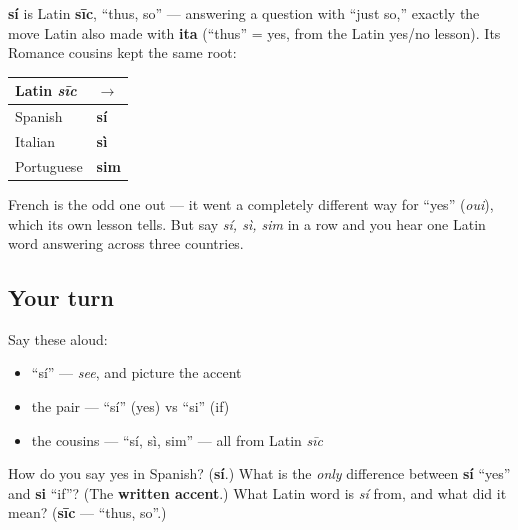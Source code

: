 \begin{cousinweb}
\textbf{sí} is Latin \textbf{sīc}, \textquotedblleft{}thus, so\textquotedblright{} — answering a question with \textquotedblleft{}just so,\textquotedblright{} exactly the move Latin also made with \textbf{ita} (\textquotedblleft{}thus\textquotedblright{} = yes, from the Latin yes/no lesson). Its Romance cousins kept the same root:

\noindent
\begin{tabularx}{\linewidth}{@{}>{\raggedright\arraybackslash}X>{\raggedright\arraybackslash}X@{}}
\toprule
\textbf{Latin \emph{sīc}} & \textbf{$\to$} \\
\midrule
Spanish & \textbf{sí} \\
Italian & \textbf{sì} \\
Portuguese & \textbf{sim} \\
\bottomrule
\end{tabularx}

French is the odd one out — it went a completely different way for \textquotedblleft{}yes\textquotedblright{} (\emph{oui}), which its own lesson tells. But say \emph{sí, sì, sim} in a row and you hear one Latin word answering across three countries.
\end{cousinweb}

\subsection*{Your turn}
Say these aloud:

\begin{itemize}
\raggedright
  \item \textquotedblleft{}sí\textquotedblright{} — \emph{see}, and picture the accent
  \item the pair — \textquotedblleft{}sí\textquotedblright{} (yes) vs \textquotedblleft{}si\textquotedblright{} (if)
  \item the cousins — \textquotedblleft{}sí, sì, sim\textquotedblright{} — all from Latin \emph{sīc}
\end{itemize}

\begin{tcolorbox}[breakable,colback=teal!4,colframe=teal!35!black,title={Before you move on}]
How do you say yes in Spanish? (\textbf{sí}.) What is the \emph{only} difference between \textbf{sí} \textquotedblleft{}yes\textquotedblright{} and \textbf{si} \textquotedblleft{}if\textquotedblright{}? (The \textbf{written accent}.) What Latin word is \emph{sí} from, and what did it mean? (\textbf{sīc} — \textquotedblleft{}thus, so\textquotedblright{}.)
\end{tcolorbox}
